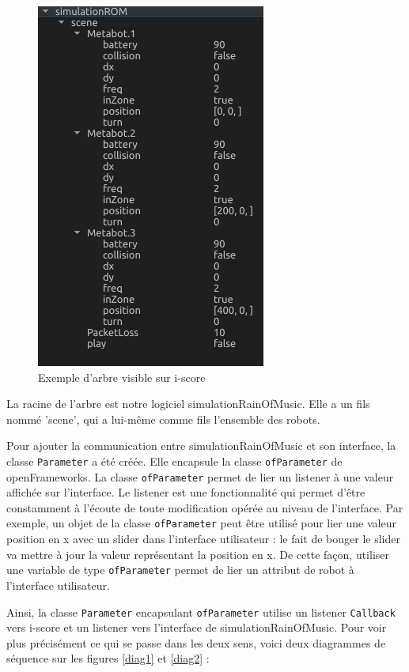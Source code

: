 \begin{figure}[H]
\centering
\includegraphics[scale=0.7]{imgs/tree}
\caption{Exemple d'arbre visible sur i-score}
\label{tr}
\end{figure}

La racine de l'arbre est notre logiciel simulationRainOfMusic. Elle a un fils nommé 'scene', qui a lui-même comme fils l'ensemble des robots.

Pour ajouter la communication entre simulationRainOfMusic et son interface, la classe \verb|Parameter| a été créée. Elle encapsule la classe \verb|ofParameter| de openFrameworks. La classe \verb|ofParameter| permet de lier un listener à une valeur affichée sur l'interface. Le listener est une fonctionnalité qui permet d'être constamment à l'écoute de toute modification opérée au niveau de l'interface. Par exemple, un objet de la classe \verb|ofParameter| peut être utilisé pour lier une valeur position en x avec un slider dans l'interface utilisateur : le fait de bouger le slider va mettre à jour la valeur représentant la position en x. De cette façon, utiliser une variable de type \verb|ofParameter| permet de lier un attribut de robot à l'interface utilisateur. 

Ainsi, la classe \verb|Parameter| encapsulant \verb|ofParameter| utilise un listener \verb|Callback| vers i-score et un listener vers l'interface de simulationRainOfMusic. Pour voir plus précisément ce qui se passe dans les deux sens, voici deux diagrammes de séquence sur les figures \ref{diag1} et \ref{diag2} :

